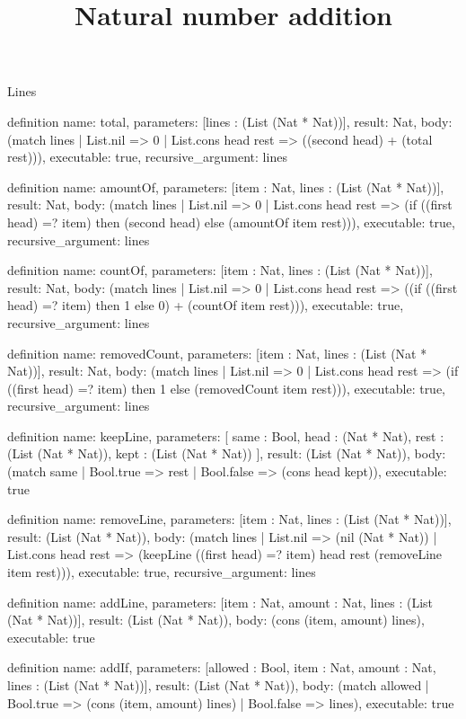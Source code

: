 \begin{lexlean}{Lines}
\title{Natural number addition}
\begin{semanticmodule}
definition{
  name: total,
  parameters: [lines : (List (Nat * Nat))],
  result: Nat,
  body: (match lines | List.nil => 0 | List.cons head rest => ((second head) + (total rest))),
  executable: true,
  recursive_argument: lines
}

definition{
  name: amountOf,
  parameters: [item : Nat, lines : (List (Nat * Nat))],
  result: Nat,
  body: (match lines
    | List.nil => 0
    | List.cons head rest => (if ((first head) =? item) then (second head) else (amountOf item rest))),
  executable: true,
  recursive_argument: lines
}

definition{
  name: countOf,
  parameters: [item : Nat, lines : (List (Nat * Nat))],
  result: Nat,
  body: (match lines
    | List.nil => 0
    | List.cons head rest => ((if ((first head) =? item) then 1 else 0) + (countOf item rest))),
  executable: true,
  recursive_argument: lines
}

definition{
  name: removedCount,
  parameters: [item : Nat, lines : (List (Nat * Nat))],
  result: Nat,
  body: (match lines
    | List.nil => 0
    | List.cons head rest => (if ((first head) =? item) then 1 else (removedCount item rest))),
  executable: true,
  recursive_argument: lines
}

definition{
  name: keepLine,
  parameters: [
    same : Bool,
    head : (Nat * Nat),
    rest : (List (Nat * Nat)),
    kept : (List (Nat * Nat))
  ],
  result: (List (Nat * Nat)),
  body: (match same | Bool.true => rest | Bool.false => (cons head kept)),
  executable: true
}

definition{
  name: removeLine,
  parameters: [item : Nat, lines : (List (Nat * Nat))],
  result: (List (Nat * Nat)),
  body: (match lines
    | List.nil => (nil (Nat * Nat))
    | List.cons head rest => (keepLine ((first head) =? item) head rest (removeLine item rest))),
  executable: true,
  recursive_argument: lines
}

definition{
  name: addLine,
  parameters: [item : Nat, amount : Nat, lines : (List (Nat * Nat))],
  result: (List (Nat * Nat)),
  body: (cons (item, amount) lines),
  executable: true
}

definition{
  name: addIf,
  parameters: [allowed : Bool, item : Nat, amount : Nat, lines : (List (Nat * Nat))],
  result: (List (Nat * Nat)),
  body: (match allowed | Bool.true => (cons (item, amount) lines) | Bool.false => lines),
  executable: true
}


\end{semanticmodule}
\end{lexlean}
